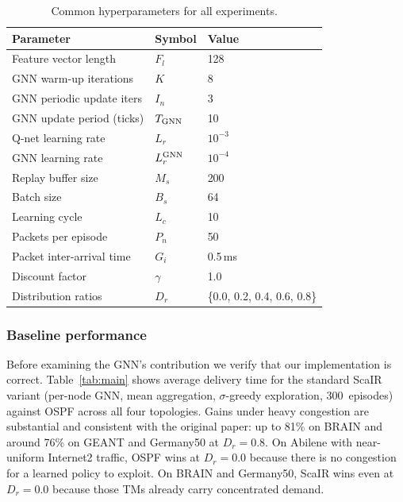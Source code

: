 \documentclass[10pt,twocolumn,letterpaper]{article}
\begin{document}
\begin{table}[t]
\centering
\caption{Common hyperparameters for all experiments.}
\label{tab:hyper}
\small
\setlength{\tabcolsep}{4pt}
\begin{tabular}{lll}
\toprule
Parameter & Symbol & Value \\
\midrule
Feature vector length      & $F_l$             & 128 \\
GNN warm-up iterations     & $K$               & 8 \\
GNN periodic update iters  & $I_n$             & 3 \\
GNN update period (ticks)  & $T_{\rm GNN}$     & 10 \\
Q-net learning rate        & $L_r$             & $10^{-3}$ \\
GNN learning rate          & $L_r^{\rm GNN}$   & $10^{-4}$ \\
Replay buffer size         & $M_s$             & 200 \\
Batch size                 & $B_s$             & 64 \\
Learning cycle             & $L_c$             & 10 \\
Packets per episode        & $P_n$             & 50 \\
Packet inter-arrival time  & $G_i$             & 0.5\,ms \\
Discount factor            & $\gamma$          & 1.0 \\
Distribution ratios        & $D_r$             & \{0.0, 0.2, 0.4, 0.6, 0.8\} \\
\bottomrule
\end{tabular}
\end{table}

\subsubsection{Baseline performance}

Before examining the GNN's contribution we verify that our
implementation is correct. Table~\ref{tab:main} shows average delivery
time for the standard ScaIR variant (per-node GNN, mean aggregation,
$\sigma$-greedy exploration, 300~episodes) against OSPF across all four
topologies. Gains under heavy congestion are substantial and consistent
with the original paper: up to 81\% on BRAIN and around 76\% on GEANT
and Germany50 at $D_r = 0.8$. On Abilene with near-uniform Internet2
traffic, OSPF wins at $D_r = 0.0$ because there is no congestion for a
learned policy to exploit. On BRAIN and Germany50, ScaIR wins even at
$D_r = 0.0$ because those TMs already carry concentrated demand.
\end{document}
